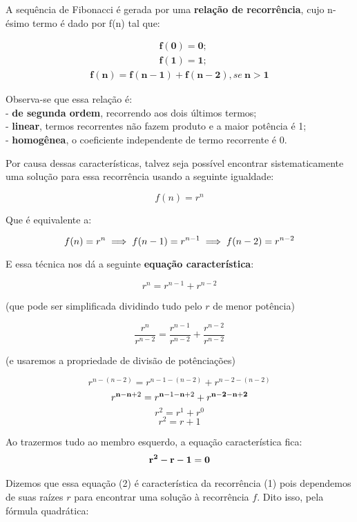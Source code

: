 \documentclass[12pt]{article}
\begin{document}
\maketitle

A sequência de Fibonacci é gerada por uma {\bf relação de recorrência},
cujo n-ésimo termo é dado por f(n) tal que:

\begin{align*}
&\boldsymbol{ f(0) = 0 };\\
&\boldsymbol{ f(1) = 1 };
\end{align*}
\begin{align}
\boldsymbol{ f(n) = f(n-1) + f(n-2) }, se\ \boldsymbol{ n > 1 }
\end{align}

Observa-se que essa relação é:\\
- {\bf de segunda ordem}, recorrendo aos dois últimos termos;\\
- {\bf linear}, termos recorrentes não fazem produto e
a maior potência é 1;\\
- {\bf homogênea}, o coeficiente independente de termo
recorrente é 0.

Por causa dessas características, talvez seja possível encontrar 
sistematicamente uma solução para essa recorrência usando a
seguinte igualdade:

$$
f(n) = r^n
$$

Que é equivalente a:

$$
f(n) = r^n \implies f(n-1) = r^{n-1} \implies f(n-2) = r^{n-2}\\
$$

E essa técnica nos dá a seguinte {\bf equação característica}:

$$
r^n = r^{n-1} + r^{n-2}
$$

(que pode ser simplificada dividindo tudo pelo $r$ de menor potência)

$$
\frac{r^{n}}{r^{n-2}} = \frac{r^{n-1}}{r^{n-2}} + \frac{r^{n-2}}{r^{n-2}}
$$

(e usaremos a propriedade de divisão de potênciações)

$$
r^{n - (n-2)} = r^{n-1 - (n-2)} + r^{n-2 - (n-2)}
$$
$$
r^{{\bf n-n}+2} = r^{{\bf n}-1{\bf-n}+2} + r^{\bf n-2-n+2}
$$
$$
r^2 = r^1 + r^0
$$
$$
r^2 = r + 1
$$

Ao trazermos tudo ao membro esquerdo, a equação característica fica:
\begin{align}
{\bf r^2 - r - 1 = 0 }
\end{align}

Dizemos que essa equação (2) é característica da recorrência (1) pois
dependemos de suas raízes $r$ para encontrar uma solução à
recorrência $f$. Dito isso, pela fórmula quadrática:
\end{document}
